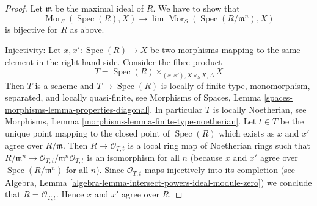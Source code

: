 \documentclass{stacks-project}
\theoremstyle{plain}
\theoremstyle{definition}
\theoremstyle{remark}
\numberwithin{equation}{subsection}
\def\lim{\mathop{\mathrm{lim}}\nolimits}
\def\Spec{\mathop{\mathrm{Spec}}}
\def\Mor{\mathop{\mathrm{Mor}}\nolimits}
\begin{document}
\begin{proof}
Let $\mathfrak m$ be the maximal ideal of $R$. We have to show that
$$
\Mor_S(\Spec(R), X) \longrightarrow \lim \Mor_S(\Spec(R/\mathfrak m^n), X)
$$
is bijective for $R$ as above.

\medskip\noindent
Injectivity: Let $x, x' : \Spec(R) \to X$
be two morphisms mapping to the same element in the right hand side.
Consider the fibre product
$$
T = \Spec(R) \times_{(x, x'), X \times_S X, \Delta} X
$$
Then $T$ is a scheme and $T \to \Spec(R)$ is locally of finite type,
monomorphism, separated, and locally quasi-finite, see
Morphisms of Spaces, Lemma \ref{spaces-morphisms-lemma-properties-diagonal}.
In particular $T$ is locally Noetherian, see
Morphisms, Lemma \ref{morphisms-lemma-finite-type-noetherian}.
Let $t \in T$ be the unique point mapping to the closed point of $\Spec(R)$
which exists as $x$ and $x'$ agree over $R/\mathfrak m$. Then
$R \to \mathcal{O}_{T, t}$ is a local ring map of Noetherian rings such that
$R/\mathfrak m^n \to \mathcal{O}_{T, t}/\mathfrak m^n\mathcal{O}_{T, t}$
is an isomorphism for all $n$ (because $x$ and $x'$ agree over
$\Spec(R/\mathfrak m^n)$ for all $n$). Since $\mathcal{O}_{T, t}$
maps injectively into its completion (see
Algebra, Lemma \ref{algebra-lemma-intersect-powers-ideal-module-zero})
we conclude that $R = \mathcal{O}_{T, t}$. Hence $x$ and $x'$ agree
over $R$.


\end{proof}
\end{document}
